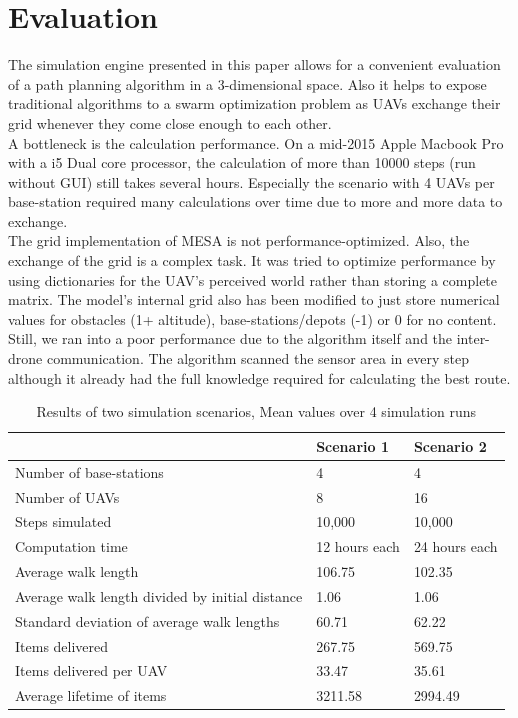 \section{Evaluation}\label{sec:evaluation}
The simulation engine presented in this paper allows for a convenient evaluation of a path planning algorithm in a 3-dimensional space. Also it helps to expose traditional algorithms to a swarm optimization problem as UAVs exchange their grid whenever they come close enough to each other.\\
A bottleneck is the calculation performance. On a mid-2015 Apple Macbook Pro 
with a i5 Dual core processor, the calculation of more than 10000 steps (run 
without GUI) still takes several hours. Especially the scenario with 4 UAVs per 
base-station required many calculations over time due to more and more data to 
exchange. \\
The grid implementation of MESA is not performance-optimized. Also, the exchange of the grid is a complex task. It was tried to optimize performance by using dictionaries for the UAV's perceived world rather than storing a complete matrix. The model's internal grid also has been modified to just store numerical values for obstacles (1+ altitude), base-stations/depots (-1) or 0 for no content.\\
Still, we ran into a poor performance due to the algorithm itself and the 
inter-drone communication. The algorithm scanned the sensor area in every step 
although it already had the full knowledge required for calculating the best 
route. 
 \begin{table}[tbhp]\label{tab:results}
 	\centering

  \begin{tabular}{  l | l | l }
     & \textbf{Scenario 1} 					& \textbf{Scenario 2}				\\ \hline
    Number of base-stations 	& 4 & 4 \\ \hline
    Number of UAVs 				& 8								& 16\\ \hline
    Steps simulated 				& 10,000 & 10,000\\ \hline
    Computation time 			& 12 hours 	each				& 24 hours each \\ \hline
    Average walk length 		& 106.75							& 102.35\\ \hline
    Average walk length divided by initial distance & 1.06 & 1.06 \\ \hline
    Standard deviation of average walk lengths & 60.71 & 62.22 \\ \hline 
    Items delivered 				& 267.75					&  569.75\\ \hline
    Items delivered per UAV & 33.47 & 35.61\\ \hline
    Average lifetime of items &3211.58 & 2994.49 

  \end{tabular}
	 	
  \caption{Results of two simulation scenarios, Mean values over 4 simulation 
  runs}
 \end{table}

